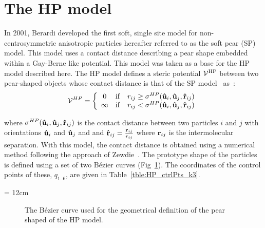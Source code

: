 

\section{The HP model}
\label{s:HP_model}

In 2001, Berardi \etal developed the first soft, single site model for non-centro\-sym\-metric
anisotropic particles
hereafter referred to as the soft pear (SP) model. This model uses a contact distance describing a
pear shape embedded within a Gay-Berne like potential. This model was taken as a base for the 
HP model described here. The HP model defines a steric potential $\mathcal{V}^{\mathrm{HP}}$ between 
two pear-shaped objects whose contact distance is that of the SP model~\cite{BerardiRicci01}
as~:
%
\begin{equation}
	\mathcal{V}^{HP} = \left\{ 	%
	\begin{array}{ccc}
		0	&\mathrm{if}	&r_{ij} \geq \sigma^{HP}(\ijr) \\
		\infty	&\mathrm{if}	&r_{ij} < \sigma^{HP}(\ijr) 
	\end{array}
	\right.
\end{equation}

where $\sigma^{HP}(\mathbf{\hat{u} }_i,\mathbf{\hat{u} }_j,\mathbf{\hat{r} }_{ij})$ is the contact distance between two particles $i$ and $j$
with orientations $\mathbf{\hat{u} }_i$ and $\mathbf{\hat{u} }_j$ and and $\mathbf{\hat{r} }_{ij} =\frac{\mathbf{r}_{ij}}{r_{ij}}$ 
where $\mathbf{r}_{ij}$ is the intermolecular separation. 
With this model, the contact distance is obtained using a numerical method 
following the approach of Zewdie~\cite{Zewdie98a,Zewdie98b}. The prototype shape of the particles is
defined using a set of two B\'ezier curves (Fig~\ref{fig:HP_bezier_k3}). The coordinates of the
control points of these, $q_{1..6}$, are given in Table~\ref{tble:HP_ctrlPts_k3}.

\picW = 12cm
\begin{figure}
	\centering
	\hspace*{2.5cm}
	\caption{The B\'ezier curve used for the geometrical definition of the pear shaped of
	the HP model.}
	\label{fig:HP_bezier_k3}
\end{figure}

